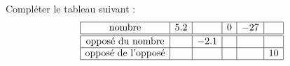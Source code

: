 
\begin{exercice}\label{exosmath-0724}

    Compléter le tableau suivant :
    \begin{equation*}
        \begin{array}[]{|c|c|c|c|c|c|}
            \hline
            \text{nombre}&5.2&&0&-27&\\
            \hline\hline
            \text{opposé du nombre}&&-2.1&&&\\
            \hline
            \text{opposé de l'opposé}&&&&&10\\
            \hline
        \end{array}
    \end{equation*}

\end{exercice}
